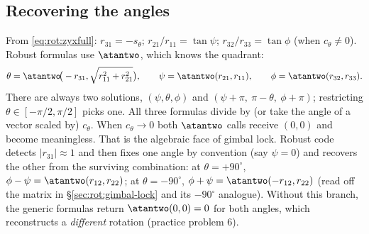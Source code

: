 \subsection{Recovering the angles}\label{sec:rot:recovering-angles}
From \eqref{eq:rot:zyxfull}: $r_{31}=-s_\theta$; $r_{21}/r_{11}=\tan\psi$; $r_{32}/r_{33}=\tan\phi$ (when $c_\theta\neq0$). Robust formulas use $\atantwo$, which knows the quadrant:
\[
\theta=\atantwo\!\big(-r_{31},\sqrt{r_{11}^2+r_{21}^2}\big),\qquad
\psi=\atantwo(r_{21},r_{11}),\qquad
\phi=\atantwo(r_{32},r_{33}).
\]
There are always two solutions, $(\psi,\theta,\phi)$ and $(\psi+\pi,\ \pi-\theta,\ \phi+\pi)$; restricting $\theta\in[-\pi/2,\pi/2]$ picks one. All three formulas divide by (or take the angle of a vector scaled by) $c_\theta$. When $c_\theta\to0$ both $\atantwo$ calls receive $(0,0)$ and become meaningless. That is the algebraic face of gimbal lock. Robust code detects $|r_{31}|\approx1$ and then fixes one angle by convention (say $\psi=0$) and recovers the other from the surviving combination: at $\theta=+90^\circ$, $\phi-\psi=\atantwo(r_{12},r_{22})$; at $\theta=-90^\circ$, $\phi+\psi=\atantwo(-r_{12},r_{22})$ (read off the matrix in \S\ref{sec:rot:gimbal-lock} and its $-90^\circ$ analogue). Without this branch, the generic formulas return $\atantwo(0,0)=0$ for both angles, which reconstructs a \emph{different} rotation (practice problem 6).
